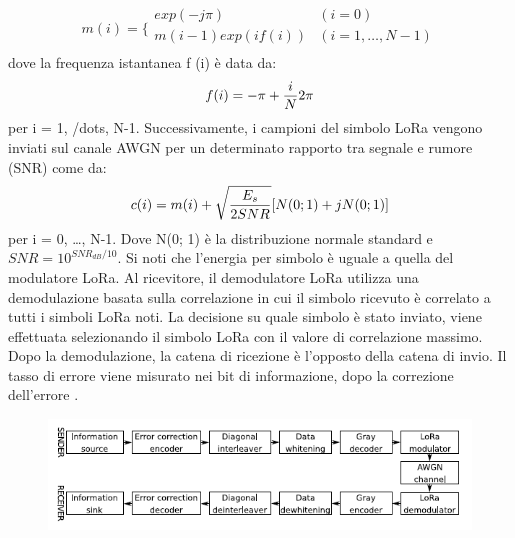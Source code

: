 \documentclass[a4paper]{report} %
\begin{document}
\begin{enumerate}
\begin{equation}
m(i) = \bigg \{
\begin{array}{rl}
exp(-j\pi) & (i = 0)\\
m(i-1)exp(if(i)) & (i = 1, \dots, N-1)\\
\end{array}
\end{equation}
dove la frequenza istantanea f (i) è data da:
\begin{equation}
f(i) = -\pi + {i \over N} 2\pi  
\end{equation}
per i = 1, /dots, N-1. Successivamente, i campioni del simbolo LoRa vengono inviati sul canale AWGN per un determinato rapporto tra segnale e rumore (SNR) come da:
\begin{equation}
c(i) = m(i) + \sqrt{E_s \over 2SNR}[N(0; 1) + jN(0; 1)]
\end{equation}
per i = 0, \dots, N-1. Dove N(0; 1) è la distribuzione normale standard e $SNR = 10^{SNR_{dB} / 10}$. Si noti che l'energia per simbolo è uguale a quella del modulatore LoRa.
Al ricevitore, il demodulatore LoRa utilizza una demodulazione basata sulla correlazione in cui il simbolo ricevuto è correlato a tutti i simboli LoRa noti. La decisione su quale simbolo è stato inviato, viene effettuata selezionando il simbolo LoRa con il valore di correlazione massimo. Dopo la demodulazione, la catena di ricezione è l'opposto della catena di invio. Il tasso di errore viene misurato nei bit di informazione, dopo la correzione dell'errore \cite{art:rif.49}.

\begin{figure}
\centering
\includegraphics[scale=.7]{Immagini/SchemaABlocchi.png}


\end{figure}
\end{enumerate}
\end{document}
